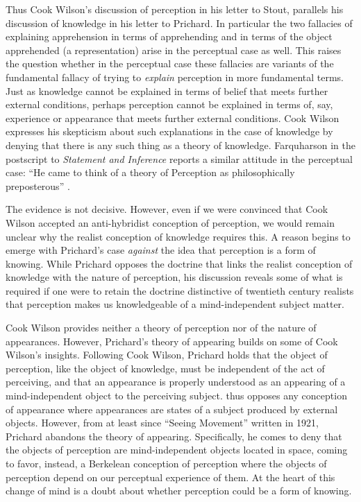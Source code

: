 Thus Cook Wilson's discussion of perception in his letter to Stout, parallels his discussion of knowledge in his letter to Prichard. In particular the two fallacies of explaining apprehension in terms of apprehending and in terms of the object apprehended (a representation) arise in the perceptual case as well. This raises the question whether in the perceptual case these fallacies are variants of the fundamental fallacy of trying to \emph{explain} perception in more fundamental terms. Just as knowledge cannot be explained in terms of belief that meets further  external conditions, perhaps perception cannot be explained in terms of, say, experience or appearance that meets further external conditions. Cook Wilson expresses his skepticism about such explanations in the case of knowledge by denying that there is any such thing as a theory of knowledge. Farquharson in the postscript to \emph{Statement and Inference} reports a similar attitude in the perceptual case: ``He came to think of a theory of Perception as philosophically preposterous'' \citep[882]{Cook-Wilson:1926sf}. 

The evidence is not decisive. However, even if we were convinced that Cook Wilson accepted an anti-hybridist conception of perception, we would remain unclear why the realist conception of knowledge requires this. A reason begins to emerge with Prichard's case \emph{against} the idea that perception is a form of knowing. While Prichard opposes the doctrine that links the realist conception of knowledge with the nature of perception, his discussion reveals some of what is required if one were to retain the doctrine distinctive of twentieth century realists that perception makes us knowledgeable of a mind-independent subject matter.

Cook Wilson provides neither a theory of perception nor of the nature of appearances. However, Prichard's \citeyearpar{Prichard:1906gf,Prichard:1909yg} theory of appearing builds on some of Cook Wilson's insights. Following Cook Wilson, Prichard holds that the object of perception, like the object of knowledge, must be independent of the act of perceiving, and that an appearance is properly understood as an appearing of a mind-independent object to the perceiving subject. \citet{Prichard:1909yg} thus opposes any conception of appearance where appearances are states of a subject produced by external objects. However, from at least since ``Seeing Movement'' written in 1921, Prichard abandons the theory of appearing. Specifically, he comes to deny that the objects of perception are mind-independent objects located in space, coming to favor, instead, a Berkelean conception of perception where the objects of perception depend on our perceptual experience of them. At the heart of this change of mind is a doubt about whether perception could be a form of knowing.

